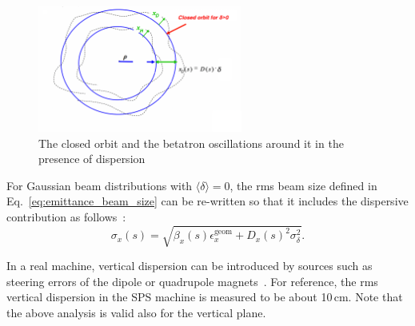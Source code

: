 \begin{figure}[!h] %
    \centering         
    \includegraphics[width=0.6\textwidth]{images/Ch2/closed_orbit_dispersion.png}
        \caption{The closed orbit and the betatron oscillations around it in the presence of dispersion~\cite{Holzer_summer_students_introduction}}
        \label{fig:closed_orbit_Dx}
 \end{figure}



For Gaussian beam distributions with $\langle \delta \rangle=0$, the rms beam size defined in Eq.~\eqref{eq:emittance_beam_size} can be re-written so that it includes the dispersive contribution as follows~\cite{wolski2014}: 
\begin{equation}\label{eq:emittance_beam_size_dispersion}
    \sigma_x(s) = \sqrt{\beta_x(s) \epsilon^{\mathrm{geom}}_x+ D_x(s)^2\sigma_\delta^2}.
\end{equation}

In a real machine, vertical dispersion can be introduced by sources such as steering errors of the dipole or quadrupole magnets~\cite{Wolski_uspas}. For reference, the rms vertical dispersion in the SPS machine is measured to be about 10\,cm. Note that the above analysis is valid also for the vertical plane.


